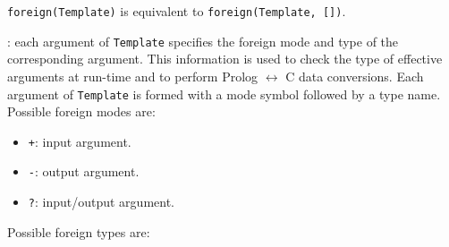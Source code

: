 \texttt{foreign(Template)} is equivalent to
\texttt{foreign(Template, [])}.

: each argument of \texttt{Template}
specifies the foreign mode and type of the corresponding argument. This
information is used to check the type of effective arguments at run-time and
to perform Prolog $\leftrightarrow$ C data conversions. Each argument of
\texttt{Template} is formed with a mode symbol followed by a type name.
Possible foreign modes are:

\begin{itemize}

\item \texttt{+}: input argument.

\item \texttt{-}: output argument.

\item \texttt{?}: input/output argument.

\end{itemize}

Possible foreign types are:

